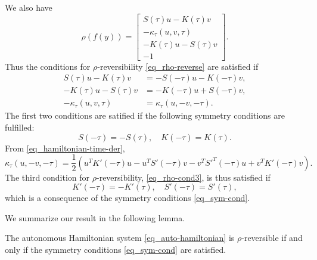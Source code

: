 \documentclass[11pt]{article}
\begin{document}
We also have
\[
\rho(f(y)) =
\begin{bmatrix}
  S(\tau) u - K(\tau)v\\
  -\kappa_\tau(u,v,\tau)\\
  -K(\tau) u - S(\tau) v\\
  -1
\end{bmatrix}.
\]
Thus the conditions for $\rho$-reversibility \eqref{eq_rho-reverse} are satisfied if
\begin{align}
S(\tau) u - K(\tau)v &= -S(-\tau) u - K(-\tau)v,\\
%
-K(\tau) u - S(\tau) v &= -K(-\tau) u + S(-\tau) v,\\
-\kappa_\tau(u,v,\tau) &= \kappa_\tau(u,-v,-\tau).\label{eq_rho-cond3}
\end{align}
The first two conditions are satified if the following symmetry conditions are fulfilled:
\begin{equation}\label{eq_sym-cond}
S(-\tau) = - S(\tau),\quad K(-\tau) = K(\tau).
\end{equation}
From \eqref{eq_hamiltonian-time-der},
\[
\kappa_\tau(u,-v,-\tau) =
\frac{1}{2}
\left(
  u^T K'(-\tau)u - u^TS'(-\tau)v -  v^T S'^T(-\tau)u +  v^T K'(-\tau)v
\right).
\]
The third condition for $\rho$-reversibility, \eqref{eq_rho-cond3}, is thus satisfied if
\[
K'(-\tau) = -K'(\tau),\quad S'(-\tau) = S'(\tau),
\]
which is a consequence of the symmetry conditions \eqref{eq_sym-cond}.

We summarize our result in the following lemma.
\begin{lemma}
  The autonomous Hamiltonian system \eqref{eq_auto-hamiltonian} is $\rho$-reversible if and only if
  the symmetry conditions \eqref{eq_sym-cond} are satisfied.
\end{lemma}
\end{document}
